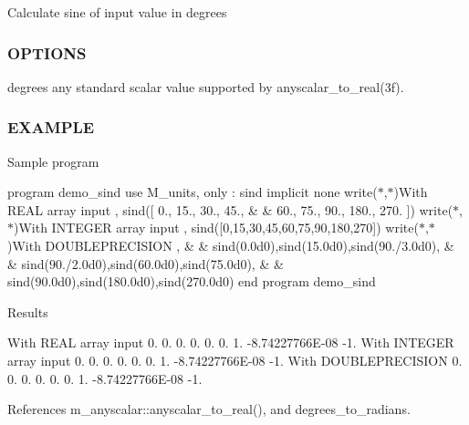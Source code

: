 Calculate sine of input value in degrees

\subsubsection*{O\+P\+T\+I\+O\+NS}

degrees any standard scalar value supported by anyscalar\+\_\+to\+\_\+real(3f). \subsubsection*{E\+X\+A\+M\+P\+LE}

Sample program

program demo\+\_\+sind use M\+\_\+units, only \+: sind implicit none write($\ast$,$\ast$)\textquotesingle{}With R\+E\+AL array input \textquotesingle{}, sind(\mbox{[} 0., 15., 30., 45., \& \& 60., 75., 90., 180., 270. \mbox{]}) write($\ast$,$\ast$)\textquotesingle{}With I\+N\+T\+E\+G\+ER array input \textquotesingle{}, sind(\mbox{[}0,15,30,45,60,75,90,180,270\mbox{]}) write($\ast$,$\ast$)\textquotesingle{}With D\+O\+U\+B\+L\+E\+P\+R\+E\+C\+I\+S\+I\+ON \textquotesingle{}, \& \& sind(0.\+0d0),sind(15.\+0d0),sind(90./3.0d0), \& \& sind(90./2.0d0),sind(60.\+0d0),sind(75.\+0d0), \& \& sind(90.\+0d0),sind(180.\+0d0),sind(270.\+0d0) end program demo\+\_\+sind

Results

With R\+E\+AL array input 0. 0. 0. 0. 0. 0. 1. -\/8.\+74227766E-\/08 -\/1. With I\+N\+T\+E\+G\+ER array input 0. 0. 0. 0. 0. 0. 1. -\/8.\+74227766E-\/08 -\/1. With D\+O\+U\+B\+L\+E\+P\+R\+E\+C\+I\+S\+I\+ON 0. 0. 0. 0. 0. 0. 1. -\/8.\+74227766E-\/08 -\/1. 

References m\+\_\+anyscalar\+::anyscalar\+\_\+to\+\_\+real(), and degrees\+\_\+to\+\_\+radians.

